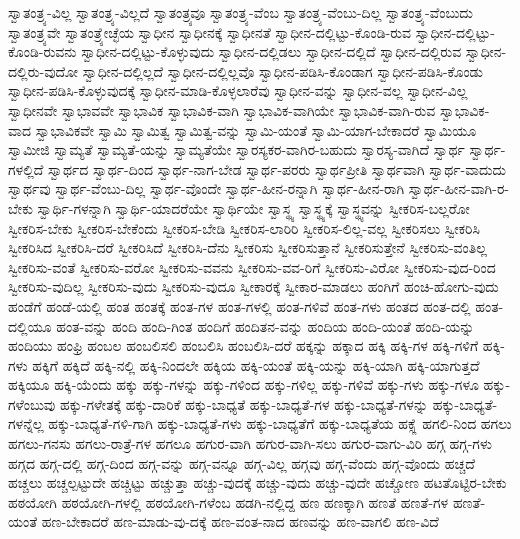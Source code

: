 {ಸ್ವಾತಂತ್ರ್ಯ-ವಿಲ್ಲ
ಸ್ವಾತಂತ್ರ್ಯ-ವಿಲ್ಲದೆ
ಸ್ವಾತಂತ್ರ್ಯವೂ
ಸ್ವಾತಂತ್ರ್ಯ-ವೆಂಬ
ಸ್ವಾತಂತ್ರ್ಯ-ವೆಂಬು-ದಿಲ್ಲ
ಸ್ವಾತಂತ್ರ್ಯ-ವೆಂಬುದು
ಸ್ವಾತಂತ್ರ್ಯವೇ
ಸ್ವಾತಂತ್ರ್ಯೇಚ್ಛೆಯ
ಸ್ವಾಧೀನ
ಸ್ವಾಧೀನಕ್ಕೆ
ಸ್ವಾಧೀನತೆ
ಸ್ವಾಧೀನ-ದಲ್ಲಿಟ್ಟು-ಕೊಂಡಿ-ರುವ
ಸ್ವಾಧೀನ-ದಲ್ಲಿಟ್ಟು-ಕೊಂಡಿ-ರುವನು
ಸ್ವಾಧೀನ-ದಲ್ಲಿಟ್ಟು-ಕೊಳ್ಳುವುದು
ಸ್ವಾಧೀನ-ದಲ್ಲಿಡಲು
ಸ್ವಾಧೀನ-ದಲ್ಲಿದೆ
ಸ್ವಾಧೀನ-ದಲ್ಲಿರುವ
ಸ್ವಾಧೀನ-ದಲ್ಲಿರು-ವುದೋ
ಸ್ವಾಧೀನ-ದಲ್ಲಿಲ್ಲದೆ
ಸ್ವಾಧೀನ-ದಲ್ಲಿಲ್ಲವೊ
ಸ್ವಾಧೀನ-ಪಡಿಸಿ-ಕೊಂಡಾಗ
ಸ್ವಾಧೀನ-ಪಡಿಸಿ-ಕೊಂಡು
ಸ್ವಾಧೀನ-ಪಡಿಸಿ-ಕೊಳ್ಳುವುದಕ್ಕೆ
ಸ್ವಾಧೀನ-ಮಾಡಿ-ಕೊಳ್ಳಲಾರೆವು
ಸ್ವಾಧೀನ-ವನ್ನು
ಸ್ವಾಧೀನ-ವಲ್ಲ
ಸ್ವಾಧೀನ-ವಿಲ್ಲ
ಸ್ವಾಧೀನವೇ
ಸ್ವಾಭಾವವೇ
ಸ್ವಾಭಾವಿಕ
ಸ್ವಾಭಾವಿಕ-ವಾಗಿ
ಸ್ವಾಭಾವಿಕ-ವಾಗಿಯೇ
ಸ್ವಾಭಾವಿಕ-ವಾಗಿ-ರುವ
ಸ್ವಾಭಾವಿಕ-ವಾದ
ಸ್ವಾಭಾವಿಕವೇ
ಸ್ವಾಮಿ
ಸ್ವಾಮಿತ್ವ
ಸ್ವಾಮಿತ್ವ-ವನ್ನು
ಸ್ವಾಮಿ-ಯಂತೆ
ಸ್ವಾಮಿ-ಯಾಗ-ಬೇಕಾದರೆ
ಸ್ವಾಮಿಯೂ
ಸ್ವಾಮೀಜಿ
ಸ್ವಾಮ್ಯತೆ
ಸ್ವಾಮ್ಯತೆ-ಯನ್ನು
ಸ್ವಾಮ್ಯತೆಯೇ
ಸ್ವಾರಸ್ಯಕರ-ವಾಗಿರ-ಬಹುದು
ಸ್ವಾರಸ್ಯ-ವಾಗಿದೆ
ಸ್ವಾರ್ಥ
ಸ್ವಾರ್ಥ-ಗಳಲ್ಲಿದೆ
ಸ್ವಾರ್ಥದ
ಸ್ವಾರ್ಥ-ದಿಂದ
ಸ್ವಾರ್ಥ-ನಾಗ-ಬೇಡ
ಸ್ವಾರ್ಥ-ಪರರು
ಸ್ವಾರ್ಥಪ್ರೀತಿ
ಸ್ವಾರ್ಥವಾಗಿ
ಸ್ವಾರ್ಥ-ವಾದುದು
ಸ್ವಾರ್ಥವು
ಸ್ವಾರ್ಥ-ವೆಂಬು-ದಿಲ್ಲ
ಸ್ವಾರ್ಥ-ವೊಂದೇ
ಸ್ವಾರ್ಥ-ಹೀನ-ರನ್ನಾಗಿ
ಸ್ವಾರ್ಥ-ಹೀನ-ರಾಗಿ
ಸ್ವಾರ್ಥ-ಹೀನ-ವಾಗಿ-ರ-ಬೇಕು
ಸ್ವಾರ್ಥಿ-ಗಳನ್ನಾಗಿ
ಸ್ವಾರ್ಥಿ-ಯಾದರೆಯೇ
ಸ್ವಾರ್ಥಿಯೇ
ಸ್ವಾಸ್ಥ್ಯ
ಸ್ವಾಸ್ಥ್ಯಕ್ಕೆ
ಸ್ವಾಸ್ಥ್ಯವನ್ನು
ಸ್ವೀಕರಿಸ-ಬಲ್ಲರೋ
ಸ್ವೀಕರಿಸ-ಬೇಕು
ಸ್ವೀಕರಿಸ-ಬೇಕೆಂದು
ಸ್ವೀಕರಿಸ-ಬೇಡಿ
ಸ್ವೀಕರಿಸ-ಲಾರಿರಿ
ಸ್ವೀಕರಿಸ-ಲಿಲ್ಲ-ವಲ್ಲ
ಸ್ವೀಕರಿಸಲು
ಸ್ವೀಕರಿಸಿ
ಸ್ವೀಕರಿಸಿದ
ಸ್ವೀಕರಿಸಿ-ದರೆ
ಸ್ವೀಕರಿಸಿದೆ
ಸ್ವೀಕರಿಸಿ-ದೆನು
ಸ್ವೀಕರಿಸು
ಸ್ವೀಕರಿಸುತ್ತಾನೆ
ಸ್ವೀಕರಿಸುತ್ತೇನೆ
ಸ್ವೀಕರಿಸು-ವಂತಿಲ್ಲ
ಸ್ವೀಕರಿಸು-ವಂತೆ
ಸ್ವೀಕರಿಸು-ವರೋ
ಸ್ವೀಕರಿಸು-ವವನು
ಸ್ವೀಕರಿಸು-ವವ-ರಿಗೆ
ಸ್ವೀಕರಿಸು-ವಿರೋ
ಸ್ವೀಕರಿಸು-ವುದ-ರಿಂದ
ಸ್ವೀಕರಿಸು-ವುದಿಲ್ಲ
ಸ್ವೀಕರಿಸು-ವುದು
ಸ್ವೀಕರಿಸು-ವುದೂ
ಸ್ವೀಕಾರಕ್ಕೆ
ಸ್ವೀಕಾರ-ಮಾಡಲು
ಹಂಗಿಗೆ
ಹಂಚಿ-ಹೋಗು-ವುದು
ಹಂಡೆಗೆ
ಹಂಡೆ-ಯಲ್ಲಿ
ಹಂತ
ಹಂತಕ್ಕೆ
ಹಂತ-ಗಳ
ಹಂತ-ಗಳಲ್ಲಿ
ಹಂತ-ಗಳಿವೆ
ಹಂತ-ಗಳು
ಹಂತದ
ಹಂತ-ದಲ್ಲಿ
ಹಂತ-ದಲ್ಲಿಯೂ
ಹಂತ-ವನ್ನು
ಹಂದಿ
ಹಂದಿ-ಗಿಂತ
ಹಂದಿಗೆ
ಹಂದಿತನ-ವನ್ನು
ಹಂದಿಯ
ಹಂದಿ-ಯಂತೆ
ಹಂದಿ-ಯನ್ನು
ಹಂದಿಯು
ಹಂಫ್ರಿ
ಹಂಬಲ
ಹಂಬಲಿಸಲಿ
ಹಂಬಲಿಸಿ
ಹಂಬಲಿಸಿ-ದರೆ
ಹಕ್ಕನ್ನು
ಹಕ್ಕಾದ
ಹಕ್ಕಿ
ಹಕ್ಕಿ-ಗಳ
ಹಕ್ಕಿ-ಗಳಿಗೆ
ಹಕ್ಕಿ-ಗಳು
ಹಕ್ಕಿಗೆ
ಹಕ್ಕಿದೆ
ಹಕ್ಕಿ-ನಲ್ಲಿ
ಹಕ್ಕಿ-ನಿಂದಲೇ
ಹಕ್ಕಿಯ
ಹಕ್ಕಿ-ಯಂತೆ
ಹಕ್ಕಿ-ಯನ್ನು
ಹಕ್ಕಿ-ಯಾಗಿ
ಹಕ್ಕಿ-ಯಾಗುತ್ತದೆ
ಹಕ್ಕಿಯೂ
ಹಕ್ಕಿ-ಯೆಂದು
ಹಕ್ಕು
ಹಕ್ಕು-ಗಳನ್ನು
ಹಕ್ಕು-ಗಳಿಂದ
ಹಕ್ಕು-ಗಳಿಲ್ಲ
ಹಕ್ಕು-ಗಳಿವೆ
ಹಕ್ಕು-ಗಳು
ಹಕ್ಕು-ಗಳೂ
ಹಕ್ಕು-ಗಳೆಂಬುವು
ಹಕ್ಕು-ಗಳೇತಕ್ಕೆ
ಹಕ್ಕು-ದಾರಿಕೆ
ಹಕ್ಕು-ಬಾಧ್ಯತೆ
ಹಕ್ಕು-ಬಾಧ್ಯತೆ-ಗಳ
ಹಕ್ಕು-ಬಾಧ್ಯತೆ-ಗಳನ್ನು
ಹಕ್ಕು-ಬಾಧ್ಯತೆ-ಗಳನ್ನೆಲ್ಲ
ಹಕ್ಕು-ಬಾಧ್ಯತೆ-ಗಳಿ-ಗಾಗಿ
ಹಕ್ಕು-ಬಾಧ್ಯತೆ-ಗಳು
ಹಕ್ಕು-ಬಾಧ್ಯತೆಗೆ
ಹಕ್ಕು-ಬಾಧ್ಯತೆಯ
ಹಕ್ಸ್ಲೆ
ಹಗಲಿ-ನಿಂದ
ಹಗಲು
ಹಗಲು-ಗನಸು
ಹಗಲು-ರಾತ್ರೆ-ಗಳ
ಹಗಲೂ
ಹಗುರ-ವಾಗಿ
ಹಗುರ-ವಾಗಿ-ಸಲು
ಹಗುರ-ವಾಗು-ವಿರಿ
ಹಗ್ಗ
ಹಗ್ಗ-ಗಳು
ಹಗ್ಗದ
ಹಗ್ಗ-ದಲ್ಲಿ
ಹಗ್ಗ-ದಿಂದ
ಹಗ್ಗ-ವನ್ನು
ಹಗ್ಗ-ವನ್ನೂ
ಹಗ್ಗ-ವಿಲ್ಲ
ಹಗ್ಗವು
ಹಗ್ಗ-ವೆಂದು
ಹಗ್ಗ-ವೊಂದು
ಹಚ್ಚದೆ
ಹಚ್ಚಲು
ಹಚ್ಚಲ್ಪಟ್ಟುದೇ
ಹಚ್ಚಿಟ್ಟು
ಹಚ್ಚುತ್ತಾ
ಹಚ್ಚು-ವುದಕ್ಕೆ
ಹಚ್ಚು-ವುದು
ಹಚ್ಚು-ವುದೇ
ಹಚ್ಚೋಣ
ಹಟತೊಟ್ಟಿರ-ಬೇಕು
ಹಠಯೋಗಿ
ಹಠಯೋಗಿ-ಗಳಲ್ಲಿ
ಹಠಯೋಗಿ-ಗಳೆಂಬ
ಹಡಗಿ-ನಲ್ಲಿದ್ದ
ಹಣ
ಹಣಕ್ಕಾಗಿ
ಹಣತೆ
ಹಣತೆ-ಗಳ
ಹಣತೆ-ಯಂತೆ
ಹಣ-ಬೇಕಾದರೆ
ಹಣ-ಮಾಡು-ವು-ದಕ್ಕೆ
ಹಣ-ವಂತ-ನಾದ
ಹಣವನ್ನು
ಹಣ-ವಾಗಲಿ
ಹಣ-ವಿದೆ
}
